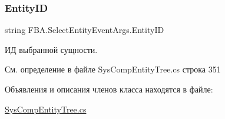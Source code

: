 \subsubsection{\texorpdfstring{Entity\+ID}{EntityID}}
{\footnotesize\ttfamily string F\+B\+A.\+Select\+Entity\+Event\+Args.\+Entity\+ID\hspace{0.3cm}{\ttfamily [get]}}



ИД выбранной сущности. 



См. определение в файле Sys\+Comp\+Entity\+Tree.\+cs строка 351



Объявления и описания членов класса находятся в файле\+:\begin{DoxyCompactItemize}
\item 
\mbox{\hyperlink{_sys_comp_entity_tree_8cs}{Sys\+Comp\+Entity\+Tree.\+cs}}\end{DoxyCompactItemize}
